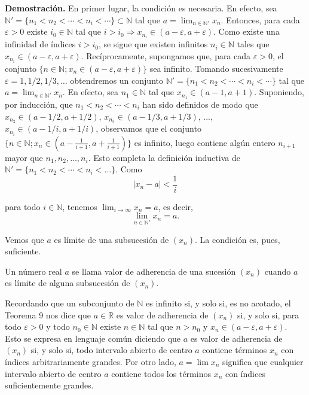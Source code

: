 \documentclass[12pt,oneside]{book}
\begin{document}
\textbf{Demostración.} En primer lugar, la condición es necesaria. En efecto, sea \(\mathbb{N}' = \{n_1 < n_2 < \cdots < n_i < \cdots\} \subset \mathbb{N}\) tal que \(a = \lim_{n \in \mathbb{N}'} x_n\). Entonces, para cada \(\varepsilon > 0\) existe \(i_0 \in \mathbb{N}\) tal que \(i > i_0 \Rightarrow x_{n_i} \in (a - \varepsilon, a + \varepsilon)\). Como existe una infinidad de índices \(i > i_0\), se sigue que existen infinitos \(n_i \in \mathbb{N}\) tales que \(x_{n_i} \in (a - \varepsilon, a + \varepsilon)\). Recíprocamente, supongamos que, para cada \(\varepsilon > 0\), el conjunto \(\{n \in \mathbb{N}; x_n \in (a - \varepsilon, a + \varepsilon)\}\) sea infinito. Tomando sucesivamente \(\varepsilon = 1, 1/2, 1/3, \ldots\) obtendremos un conjunto \(\mathbb{N}' = \{n_1 < n_2 < \cdots < n_i < \cdots\}\) tal que \(a = \lim_{n \in \mathbb{N}'} x_n\). En efecto, sea \(n_1 \in \mathbb{N}\) tal que \(x_{n_1} \in (a - 1, a + 1)\). Suponiendo, por inducción, que \(n_1 < n_2 < \cdots < n_i\) han sido definidos de modo que \(x_{n_2} \in (a - 1/2, a + 1/2)\), \(x_{n_3} \in (a - 1/3, a + 1/3)\), ..., \(x_{n_i} \in (a - 1/i, a + 1/i)\), observamos que el conjunto \(\{n \in \mathbb{N}; x_n \in (a - \frac{1}{i+1}, a + \frac{1}{i+1})\}\) es infinito, luego contiene algún entero \(n_{i+1}\) mayor que \(n_1, n_2, \ldots, n_i\). Esto completa la definición inductiva de \(\mathbb{N}' = \{n_1 < n_2 < \cdots < n_i < \ldots\}\). Como
\[
\left| x_n - a \right| < \frac{1}{i}
\]

para todo \(i \in \mathbb{N}\), tenemos \(\lim_{i \to \infty} x_n = a\), es decir,
\[
\lim_{n \in \mathbb{N}'} x_n = a.
\]

Vemos que \(a\) es límite de una subsucesión de \((x_n)\). La condición es, pues, suficiente.

Un número real \(a\) se llama valor de adherencia de una sucesión \((x_n)\) cuando \(a\) es límite de alguna subsucesión de \((x_n)\).

Recordando que un subconjunto de \(\mathbb{N}\) es infinito si, y solo si, es no acotado, el Teorema 9 nos dice que \(a \in \mathbb{R}\) es valor de adherencia de \((x_n)\) si, y solo si, para todo \(\varepsilon > 0\) y todo \(n_0 \in \mathbb{N}\) existe \(n \in \mathbb{N}\) tal que \(n > n_0\) y \(x_n \in (a-\varepsilon, a+\varepsilon)\). Esto se expresa en lenguaje común diciendo que \(a\) es valor de adherencia de \((x_n)\) si, y solo si, todo intervalo abierto de centro \(a\) contiene términos \(x_n\) con índices arbitrariamente grandes. Por otro lado, \(a = \lim x_n\) significa que cualquier intervalo abierto de centro \(a\) contiene todos los términos \(x_n\) con índices suficientemente grandes.
\end{document}
